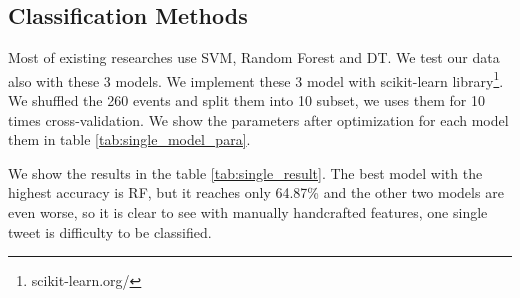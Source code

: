 \subsection{Classification Methods}
Most of existing researches use SVM, Random Forest and DT. We test our data also with these 3 models.  We implement these 3 model with scikit-learn library\footnote{scikit-learn.org/}. We shuffled the 260 events and split them into 10 subset, we uses them for 10 times cross-validation. We show the parameters after optimization for each model them in table \ref{tab:single_model_para}.

\begin{table}[!h]
 \centering
{}
 \caption{Parameters of Classification models}
 \label{tab:single_model_para}
\end{table}

 We show the results in the table \ref{tab:single_result}. The  best model with the highest accuracy is RF, but it reaches only 64.87\% and the other two models are even worse, so it is clear to see with manually handcrafted features, one single tweet is difficulty to be classified.  
 \begin{table}[!h]
 \centering
{}
 \caption{Prediction Accuracy of Different Single Tweet's Creditability Scoring Models}
 \label{tab:single_result}
\end{table}

